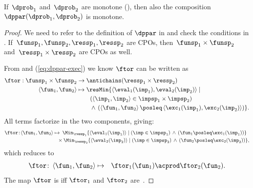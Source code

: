 \begin{prop}
\label{pro:dppar-monotone}If~$\dprob_{1}$ and~$\dprob_{2}$ are
monotone (), then also the composition~$\dppar(\dprob_{1},\dprob_{2})$
is monotone.
\end{prop}
\begin{proof}
We need to refer to the definition of $\dppar$ in 
and check the conditions in . If~$\funsp_{1},\funsp_{2},\ressp_{1},\ressp_{2}$
are CPOs, then~$\funsp_{1}\times\funsp_{2}$ and~$\ressp_{1}\times\ressp_{2}$
are CPOs as well.

From  and (\ref{eq:dppar-exec}) we know $\ftor$ can
be written as
\begin{align*}
\ftor:\funsp_{1}\times\funsp_{2} & \rightarrow\antichains(\ressp_{1}\times\ressp_{2})\\
\left\langle \fun_{1},\fun_{2}\right\rangle  & \mapsto\resMin\{\left\langle \eval_{1}(\imp_{1}),\eval_{2}(\imp_{2})\right\rangle \mid\\
 & \qquad\left(\left\langle \imp_{1},\imp_{2}\right\rangle \in\impsp_{1}\times\impsp_{2}\right)\\
 & \qquad\,\wedge\,\left(\left\langle \fun_{1},\fun_{2}\right\rangle \posleq\left\langle \exc_{1}(\imp_{1}),\exc_{2}(\imp_{2})\right\rangle \right)\}.
\end{align*}
All terms factorize in the two components, giving:{\small{}
\begin{align*}
\ftor\!:\!\left\langle \fun_{1},\fun_{2}\right\rangle \mapsto & \!\!\!\quad\Min_{\ressp_{1}}\{\left\langle \eval_{1}(\imp_{1})\right\rangle \mid\left(\imp\in\impsp_{1}\right)\,\wedge\,\left(\fun_{1}\posleq\exc_{1}(\imp_{1})\right)\}\\
 & \!\!\!\times\Min_{\ressp_{2}}\{\left\langle \eval_{2}(\imp_{2})\right\rangle \mid\left(\imp\in\impsp_{2}\right)\,\wedge\,\left(\fun_{2}\posleq\exc_{2}(\imp_{2})\right)\},
\end{align*}
}which reduces to 
\begin{eqnarray}
\ftor\colon\left\langle \fun_{1},\fun_{2}\right\rangle  & \mapsto & \ftor_{1}(\fun_{1})\acprod\ftor_{2}(\fun_{2}).\label{eq:isproduct}
\end{eqnarray}
The map $\ftor$ is \scottcontinuous iff $\ftor_{1}$ and $\ftor_{2}$
are~\cite[Lemma II.2.8]{gierz03continuous}.
\end{proof}

